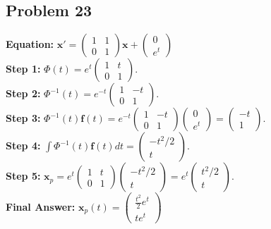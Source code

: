 \documentclass[11pt]{article}
\begin{document}
\subsection*{Problem 23}
\textbf{Equation:} $\mathbf{x}' = \begin{pmatrix} 1 & 1 \\ 0 & 1 \end{pmatrix} \mathbf{x} + \begin{pmatrix} 0 \\ e^t \end{pmatrix}$ \\
\textbf{Step 1:} $\Phi(t) = e^t \begin{pmatrix} 1 & t \\ 0 & 1 \end{pmatrix}$. \\
\textbf{Step 2:} $\Phi^{-1}(t) = e^{-t} \begin{pmatrix} 1 & -t \\ 0 & 1 \end{pmatrix}$. \\
\textbf{Step 3:} $\Phi^{-1}(t)\mathbf{f}(t) = e^{-t} \begin{pmatrix} 1 & -t \\ 0 & 1 \end{pmatrix} \begin{pmatrix} 0 \\ e^t \end{pmatrix} = \begin{pmatrix} -t \\ 1 \end{pmatrix}$. \\
\textbf{Step 4:} $\int \Phi^{-1}(t)\mathbf{f}(t) dt = \begin{pmatrix} -t^2/2 \\ t \end{pmatrix}$. \\
\textbf{Step 5:} $\mathbf{x}_p = e^t \begin{pmatrix} 1 & t \\ 0 & 1 \end{pmatrix} \begin{pmatrix} -t^2/2 \\ t \end{pmatrix} = e^t \begin{pmatrix} t^2/2 \\ t \end{pmatrix}$. \\
\textbf{Final Answer:} $\mathbf{x}_p(t) = \begin{pmatrix} \frac{t^2}{2}e^t \\ te^t \end{pmatrix}$
\end{document}
